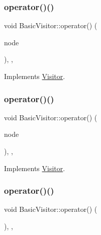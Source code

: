 \subsubsection{\texorpdfstring{operator()()}{operator()()}\hspace{0.1cm}{\footnotesize\ttfamily [8/60]}}
{\footnotesize\ttfamily void Basic\+Visitor\+::operator() (\begin{DoxyParamCaption}\item[{const \hyperlink{struct_array_literal}{Array\+Literal} \&}]{node }\end{DoxyParamCaption})\hspace{0.3cm}{\ttfamily [inline]}, {\ttfamily [override]}, {\ttfamily [virtual]}}



Implements \hyperlink{struct_visitor_a46f9846468f2c12ddc585cfe0421e6f0}{Visitor}.

\mbox{\label{struct_basic_visitor_a1f0d676e1575a8efa7fd7149ef9d93be}} 
\subsubsection{\texorpdfstring{operator()()}{operator()()}\hspace{0.1cm}{\footnotesize\ttfamily [9/60]}}
{\footnotesize\ttfamily void Basic\+Visitor\+::operator() (\begin{DoxyParamCaption}\item[{const \hyperlink{struct_object_literal}{Object\+Literal} \&}]{node }\end{DoxyParamCaption})\hspace{0.3cm}{\ttfamily [inline]}, {\ttfamily [override]}, {\ttfamily [virtual]}}



Implements \hyperlink{struct_visitor_ad85d9aa9718801a1a8233cf51d8f7055}{Visitor}.

\mbox{\label{struct_basic_visitor_aa3811d723e70227de815461380d861c9}} 
\subsubsection{\texorpdfstring{operator()()}{operator()()}\hspace{0.1cm}{\footnotesize\ttfamily [10/60]}}
{\footnotesize\ttfamily void Basic\+Visitor\+::operator() (\begin{DoxyParamCaption}\item[{const \hyperlink{struct_this_expression}{This\+Expression} \&}]{ }\end{DoxyParamCaption})\hspace{0.3cm}{\ttfamily [inline]}, {\ttfamily [override]}, {\ttfamily [virtual]}}



